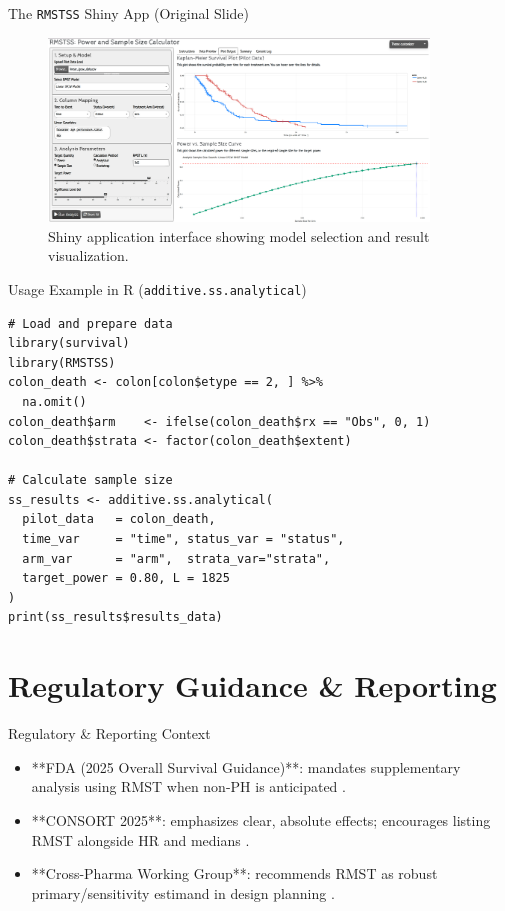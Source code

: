 \documentclass{beamer}
\begin{document}
\begin{frame}{The \texttt{RMSTSS} Shiny App (Original Slide)}
\begin{figure}
  \includegraphics[width=0.9\textwidth]{images/app-ss.png}
  \caption{Shiny application interface showing model selection and result visualization.}
\end{figure}
\end{frame}

\begin{frame}[fragile]{Usage Example in R (\texttt{additive.ss.analytical})}
\begin{verbatim}
# Load and prepare data
library(survival)
library(RMSTSS)
colon_death <- colon[colon$etype == 2, ] %>% 
  na.omit()
colon_death$arm    <- ifelse(colon_death$rx == "Obs", 0, 1)
colon_death$strata <- factor(colon_death$extent)

# Calculate sample size
ss_results <- additive.ss.analytical(
  pilot_data   = colon_death,
  time_var     = "time", status_var = "status",
  arm_var      = "arm",  strata_var="strata",
  target_power = 0.80, L = 1825
)
print(ss_results$results_data)
\end{verbatim}
\end{frame}

\section{Regulatory Guidance \& Reporting}

\begin{frame}{Regulatory & Reporting Context}
\begin{itemize}
  \item **FDA (2025 Overall Survival Guidance)**: mandates supplementary analysis using RMST when non-PH is anticipated \cite{FDAOS2025}.
  \item **CONSORT 2025**: emphasizes clear, absolute effects; encourages listing RMST alongside HR and medians \cite{CONSORT2025,CONSORT2025BMJ}.
  \item **Cross-Pharma Working Group**: recommends RMST as robust primary/sensitivity estimand in design planning \cite{CrossPharma2020}.
\end{itemize}
\end{frame}
\end{document}
